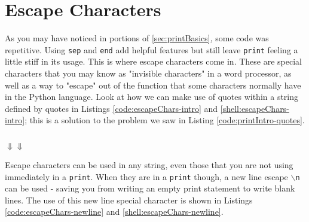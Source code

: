 \documentclass{book}
\newcommand{\pythonSub}[5]{
    \usemintedstyle{autumn}
    \begin{listing}[htb]
        \begin{mdframed}[backgroundcolor=codebg]
            \inputminted[firstline=#2, lastline=#3, linenos]{python}{#1}
        \end{mdframed}
        \caption{#4}
        \label{#5}
    \end{listing}
}
\newcommand{\shellSub}[5]{
    \begin{listing}[htb]
        \begin{mdframed}[backgroundcolor=codebg]
              
        \end{mdframed}
        \caption{#4}
        \label{#5}
    \end{listing}
}
\newcommand{\pythonAndShellSub}[8]{
\usemintedstyle{autumn}
    \begin{listing}[htb]
 	   \begin{mdframed}[backgroundcolor=codebg]
            \inputminted[firstline=#2, lastline=#3, linenos]{python}{#1}
        \end{mdframed}
        \hspace{5em}$\Downarrow$\hfill$\Downarrow$\hspace{5em}
        \begin{mdframed}[backgroundcolor=codebg]
              
        \end{mdframed}
        \caption{#7}
        \label{#8}
    \end{listing}
}
\begin{document}
\section{Escape Characters}\label{sec:escapeChars}

As you may have noticed in portions of \ref{sec:printBasics}, some code was repetitive. Using \texttt{sep} and \texttt{end} add helpful features but still leave \texttt{print} feeling a little stiff in its usage. This is where escape characters come in. These are special characters that you may know as "invisible characters" in a word processor, as well as a way to "escape" out of the function that some characters normally have in the Python language. Look at how we can make use of quotes within a string defined by quotes in Listings \ref{code:escapeChars-intro} and \ref{shell:escapeChars-intro}; this is a solution to the problem we saw in Listing \ref{code:printIntro-quotes}.

%
%    
\pythonAndShellSub{../../../docCode/chapter2/section2/printIntroEscapes.py}
{1}{4}
{../../../docCode/chapter2/section2/printIntroEscapes.txt}
{1}{4}
{}
{pyshell:escapeChars-intro}

Escape characters can be used in any string, even those that you are not using immediately in a \texttt{print}. When they are in a \texttt{print} though, a new line escape \texttt{$\backslash$n} can be used - saving you from writing an empty print statement to write blank lines. The use of this new line special character is shown in Listings \ref{code:escapeChars-newline} and \ref{shell:escapeChars-newline}.

%
    
\end{document}
